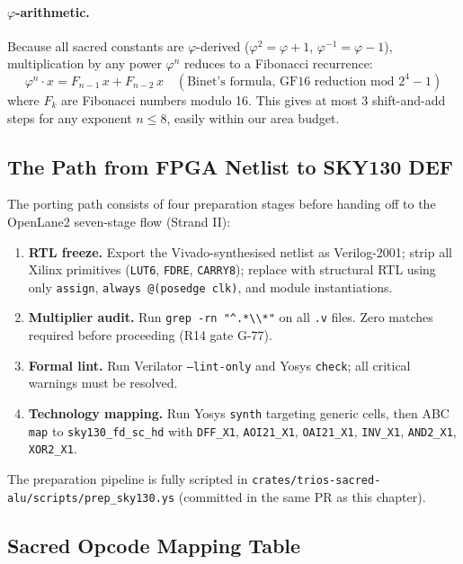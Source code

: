\paragraph{$\varphi$-arithmetic.}
Because all sacred constants are $\varphi$-derived
($\varphi^2 = \varphi+1$, $\varphi^{-1} = \varphi-1$),
multiplication by any power $\varphi^n$ reduces to a Fibonacci recurrence:
\[
  \varphi^n \cdot x
  = F_{n-1}\,x + F_{n-2}\,x
  \quad (\text{Binet's formula, GF16 reduction mod } 2^4-1)
\]
where $F_k$ are Fibonacci numbers modulo 16.
This gives at most 3 shift-and-add steps for any exponent $n \le 8$,
easily within our area budget.

\subsection{The Path from FPGA Netlist to SKY130 DEF}
\label{subsec:72:fpga-to-def}

The porting path consists of four preparation stages before handing off
to the OpenLane2 seven-stage flow (Strand II):

\begin{enumerate}
  \item \textbf{RTL freeze.}
    Export the Vivado-synthesised netlist as Verilog-2001;
    strip all Xilinx primitives (\texttt{LUT6}, \texttt{FDRE}, \texttt{CARRY8});
    replace with structural RTL using only
    \texttt{assign}, \texttt{always @(posedge clk)}, and module instantiations.
  \item \textbf{Multiplier audit.}
    Run \texttt{grep -rn "\textasciicircum{}.*\textbackslash{}\textbackslash{}*"} on all
    \texttt{.v} files.
    Zero matches required before proceeding (R14 gate G-77).
  \item \textbf{Formal lint.}
    Run Verilator \texttt{--lint-only} and Yosys \texttt{check};
    all critical warnings must be resolved.
  \item \textbf{Technology mapping.}
    Run Yosys \texttt{synth} targeting generic cells, then
    ABC \texttt{map} to \texttt{sky130\_fd\_sc\_hd} with
    \texttt{DFF\_X1}, \texttt{AOI21\_X1}, \texttt{OAI21\_X1},
    \texttt{INV\_X1}, \texttt{AND2\_X1}, \texttt{XOR2\_X1}.
\end{enumerate}

The preparation pipeline is fully scripted in
\texttt{crates/trios-sacred-alu/scripts/prep\_sky130.ys}
(committed in the same PR as this chapter).

\subsection{Sacred Opcode Mapping Table}
\label{subsec:72:opcode-table}

